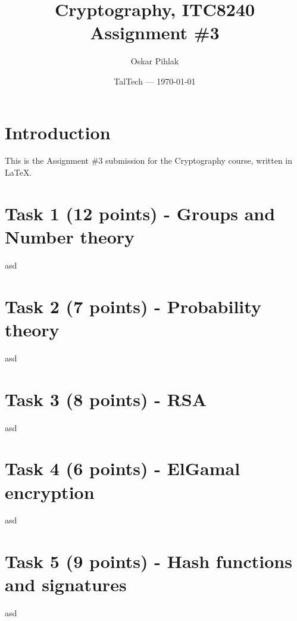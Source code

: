 \documentclass{article}
\title{Cryptography, ITC8240 Assignment \#3} %
\author{Oskar Pihlak} %
\date{TalTech --- \today} %
\begin{document}
\maketitle %


\section*{Introduction} %

This is the Assignment \#3 submission for the Cryptography course, written in LaTeX.\\




\section*{Task 1 (12 points) - Groups and Number theory} %
asd

\section*{Task 2 (7 points) - Probability theory} %
asd

\section*{Task 3 (8 points) - RSA} %
asd

\section*{Task 4 (6 points) - ElGamal encryption} %
asd

\section*{Task 5 (9 points) - Hash functions and signatures} %
asd
\end{document}
